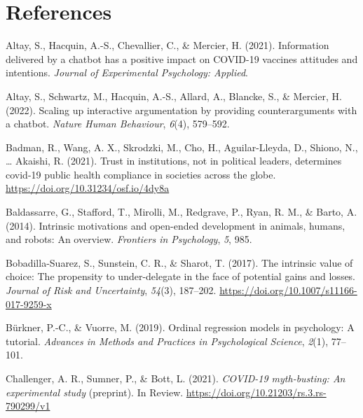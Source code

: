 \documentclass[
  english,
  ,jou,floatsintext]{apa6}
\newlength{\cslhangindent}
\newlength{\cslentryspacingunit} %
\newenvironment{CSLReferences}[2] %
 {%
  \setlength{\parindent}{0pt}
  \ifodd #1
  \let\oldpar\par
  \def\par{\hangindent=\cslhangindent\oldpar}
  \fi
  \setlength{\parskip}{#2\cslentryspacingunit}
 }%
 {}
\begin{document}
\hypertarget{references}{%
\section*{References}\label{references}}

\hypertarget{refs}{}
\begin{CSLReferences}{1}{0}
\leavevmode{}%
Altay, S., Hacquin, A.-S., Chevallier, C., \& Mercier, H. (2021). Information delivered by a chatbot has a positive impact on COVID-19 vaccines attitudes and intentions. \emph{Journal of Experimental Psychology: Applied}.

\leavevmode{}%
Altay, S., Schwartz, M., Hacquin, A.-S., Allard, A., Blancke, S., \& Mercier, H. (2022). Scaling up interactive argumentation by providing counterarguments with a chatbot. \emph{Nature Human Behaviour}, \emph{6}(4), 579--592.

\leavevmode{}%
Badman, R., Wang, A. X., Skrodzki, M., Cho, H., Aguilar-Lleyda, D., Shiono, N., \ldots{} Akaishi, R. (2021). Trust in institutions, not in political leaders, determines covid-19 public health compliance in societies across the globe. \url{https://doi.org/10.31234/osf.io/4dy8a}

\leavevmode{}%
Baldassarre, G., Stafford, T., Mirolli, M., Redgrave, P., Ryan, R. M., \& Barto, A. (2014). Intrinsic motivations and open-ended development in animals, humans, and robots: An overview. \emph{Frontiers in Psychology}, \emph{5}, 985.

\leavevmode{}%
Bobadilla-Suarez, S., Sunstein, C. R., \& Sharot, T. (2017). The intrinsic value of choice: {The} propensity to under-delegate in the face of potential gains and losses. \emph{Journal of Risk and Uncertainty}, \emph{54}(3), 187--202. \url{https://doi.org/10.1007/s11166-017-9259-x}

\leavevmode{}%
Bürkner, P.-C., \& Vuorre, M. (2019). Ordinal regression models in psychology: A tutorial. \emph{Advances in Methods and Practices in Psychological Science}, \emph{2}(1), 77--101.

\leavevmode{}%
Challenger, A. R., Sumner, P., \& Bott, L. (2021). \emph{{COVID}-19 myth-busting: An experimental study} (preprint). In Review. \url{https://doi.org/10.21203/rs.3.rs-790299/v1}


\end{CSLReferences}
\end{document}
